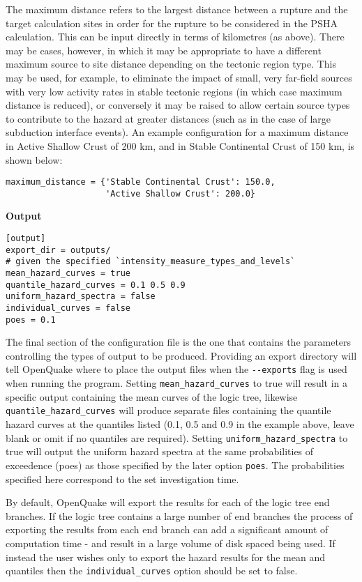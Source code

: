 The maximum distance refers to the largest distance between a rupture and the target calculation sites in order for the rupture to be considered in the PSHA calculation. This can be input directly in terms of kilometres (as above). There may be cases, however, in which it may be appropriate to have a different maximum source to site distance depending on the tectonic region type. This may be used, for example, to eliminate the impact of small, very far-field sources with very low activity rates in stable tectonic regions (in which case maximum distance is reduced), or conversely it may be raised to allow certain source types to contribute to the hazard at greater distances (such as in the case of large subduction interface events). An example configuration for a maximum distance in Active Shallow Crust of 200 km, and in Stable Continental Crust of 150 km, is shown below:
\begin{verbatim}
maximum_distance = {'Stable Continental Crust': 150.0,
                    'Active Shallow Crust': 200.0}
\end{verbatim}


\textbf{Output}

\begin{verbatim}
[output]
export_dir = outputs/
# given the specified `intensity_measure_types_and_levels`
mean_hazard_curves = true
quantile_hazard_curves = 0.1 0.5 0.9
uniform_hazard_spectra = false
individual_curves = false
poes = 0.1
\end{verbatim}

The final section of the configuration file is the one that contains the
parameters controlling the types of output to be produced. Providing an export directory will tell OpenQuake where to place the output files when the \texttt{-{}-exports} flag is used when running the program. Setting \verb=mean_hazard_curves= to true will result in a specific output containing the mean curves of the logic tree, likewise \verb=quantile_hazard_curves= will produce separate files containing the quantile hazard curves at the quantiles listed (0.1, 0.5 and 0.9 in the example above, leave blank or omit if no quantiles are required). Setting \verb=uniform_hazard_spectra= to true will output the uniform hazard spectra at the same probabilities of exceedence (poes) as those specified by the later option \verb=poes=. The probabilities specified here correspond to the set investigation time. 

By default, OpenQuake will export the results for each of the logic tree end branches. If the logic tree contains a large number of end branches the process of exporting the results from each end branch can add a significant amount of computation time - and result in a large volume of disk spaced being used. If instead the user wishes only to export the hazard results for the mean and quantiles then the \verb=individual_curves= option should be set to false. 
